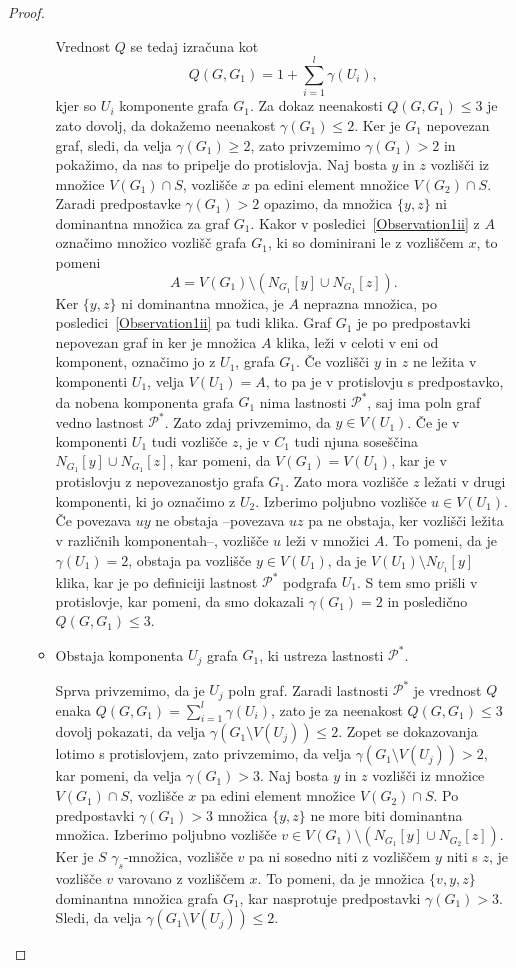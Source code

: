 \documentclass[12pt,a4paper,twoside]{article}
\theoremstyle{definition} %
\theoremstyle{plain} %
\numberwithin{equation}{section}  %
\begin{document}
\begin{proof}
\begin{itemize}
\begin{itemize}
Vrednost $Q$ se tedaj izračuna kot $$Q(G, G_1) = 1 + \sum\limits_{i=1}^l \gamma(U_i),$$ kjer so $U_i$ komponente grafa $G_1$. Za dokaz neenakosti $Q(G, G_1) \leq 3$ je zato dovolj, da dokažemo neenakost $\gamma(G_1) \leq 2$. Ker je $G_1$ nepovezan graf, sledi, da velja $\gamma(G_1) \geq 2$, zato privzemimo $\gamma(G_1) > 2$ in pokažimo, da nas to pripelje do protislovja. Naj bosta $y$ in $z$ vozlišči iz množice $V(G_1) \cap S$, vozlišče $x$ pa edini element množice  $V(G_2) \cap S$. Zaradi predpostavke $\gamma(G_1) > 2$ opazimo, da množica $\{y, z\}$ ni dominantna množica za graf $G_1$. Kakor v posledici~\ref{Observation1ii} z $A$ označimo množico vozlišč grafa $G_1$, ki so dominirani le z vozliščem $x$, to pomeni $$A = V(G_1) \setminus (N_{G_1}[y] \cup N_{G_1}[z] ).$$ Ker $\{y, z\}$ ni dominantna množica, je $A$ neprazna množica, po posledici~\ref{Observation1ii} pa tudi klika. Graf $G_1$ je po predpostavki nepovezan graf in ker je množica $A$ klika, leži v celoti v eni od komponent, označimo jo z $U_1$, grafa $G_1$. Če vozlišči $y$ in  $z$ ne ležita v komponenti $U_1$, velja $V(U_1) = A$, to pa je v protislovju s predpostavko, da nobena komponenta grafa $G_1$ nima lastnosti $\mathcal{P^*}$, saj ima poln graf vedno lastnost $\mathcal{P^*}$. Zato zdaj privzemimo, da $y \in V(U_1)$. Če je v komponenti $U_1$ tudi vozlišče $z$, je v $C_1$ tudi njuna soseščina $N_{G_1}[y] \cup N_{G_1}[z]$, kar pomeni, da $V(G_1) = V(U_1)$, kar je v protislovju z nepovezanostjo grafa $G_1$. Zato mora vozlišče $z$ ležati v drugi komponenti, ki jo označimo z $U_2$. Izberimo poljubno vozlišče $u \in V(U_1)$. Če povezava $uy$ ne obstaja --povezava $uz$ pa ne obstaja, ker vozlišči ležita v različnih komponentah--, vozlišče $u$ leži v množici $A$. To pomeni, da je $\gamma(U_1) = 2$, obstaja pa vozlišče $y \in V(U_1)$, da je $V(U_1) \setminus N_{U_1} [y]$ klika, kar je po definiciji lastnost $\mathcal{P^*}$ podgrafa $U_1$. S tem smo prišli v protislovje, kar pomeni, da smo dokazali $\gamma(G_1) = 2$ in posledično $Q(G, G_1) \leq 3$.

\medskip
\item Obstaja komponenta $U_j$ grafa $G_1$, ki ustreza lastnosti $\mathcal{P^*}$.

Sprva privzemimo, da je $U_j$ poln graf. Zaradi lastnosti $\mathcal{P^*}$ je vrednost $Q$ enaka $Q(G, G_1) = \sum\limits_{i=1}^l \gamma(U_i)$, zato je za neenakost $Q(G, G_1) \leq 3$ dovolj pokazati, da velja $\gamma(G_1 \setminus V(U_j)) \leq 2$. Zopet se dokazovanja lotimo s protislovjem, zato privzemimo, da velja $\gamma(G_1 \setminus V(U_j)) > 2$, kar pomeni, da velja $\gamma(G_1) > 3$. Naj bosta $y$ in $z$ vozlišči iz množice $V(G_1) \cap S$, vozlišče $x$ pa edini element množice  $V(G_2) \cap S$. Po predpostavki $\gamma(G_1) > 3$ množica $\{y, z\}$ ne more biti dominantna množica. Izberimo poljubno vozlišče $v \in V(G_1) \setminus (N_{G_1}[y] \cup N_{G_2}[z])$. Ker je $S$ $\gamma_s$-množica, vozlišče $v$ pa ni sosedno niti z vozliščem $y$ niti s $z$, je vozlišče $v$ varovano z vozliščem $x$. To pomeni, da je množica $\{v, y, z\}$ dominantna množica grafa $G_1$, kar nasprotuje predpostavki $\gamma(G_1) > 3$. Sledi, da velja $\gamma(G_1 \setminus V(U_j)) \leq 2$.


\end{itemize}
\end{itemize}
\end{proof}
\end{document}
